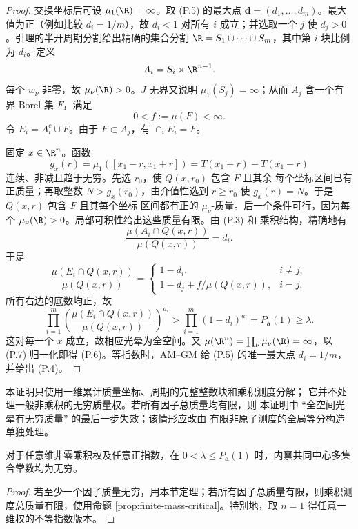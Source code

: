 \begin{proof}
交换坐标后可设 $\mu_1(\R)=\infty$。取 (P.5) 的最大点
$\boldsymbol d=(d_1,\ldots,d_m)$。最大值为正（例如比较
$d_i=1/m$），故 $d_i<1$ 对所有 $i$ 成立；并选取一个 $j$ 使
$d_j>0$。引理的半开周期分割给出精确的集合分割
$\R=S_1\mathbin{\dot\cup}\cdots\mathbin{\dot\cup}S_m$，其中第 $i$ 块比例为
$d_i$。定义
\[
 A_i=S_i\times\R^{n-1}.
\]
每个 $w_\nu$ 非零，故 $\mu_\nu(\R)>0$。$J$ 无界又说明
$\mu_1(S_j)=\infty$；从而 $A_j$ 含一个有界 Borel 集 $F$，满足
\[
 0<f:=\mu(F)<\infty. \tag{P.7}
\]
令 $E_i=A_i^c\cup F$。由于 $F\subset A_j$，有
$\cap_iE_i=F$。

固定 $x\in\R^n$。函数
\[
 g_x(r)=\mu_1([x_1-r,x_1+r])
=T(x_1+r)-T(x_1-r)
\]
连续、非减且趋于无穷。先选 $r_0$，使 $Q(x,r_0)$ 包含 $F$ 且其余
每个坐标区间已有正质量；再取整数 $N>g_x(r_0)$，由介值性选到
$r\ge r_0$ 使 $g_x(r)=N$。于是 $Q(x,r)$ 包含 $F$ 且其每个坐标
区间都有正的 $\mu_\nu$-质量。后一个条件可行，因为每个
$\mu_\nu(\R)>0$。局部可积性给出这些质量有限。由 (P.3) 和
乘积结构，精确地有
\[
 \frac{\mu(A_i\cap Q(x,r))}{\mu(Q(x,r))}=d_i. \tag{P.8}
\]
于是
\[
 \frac{\mu(E_i\cap Q(x,r))}{\mu(Q(x,r))}
 =\begin{cases}
 1-d_i,&i\ne j,\\
 1-d_j+f/\mu(Q(x,r)),&i=j.
 \end{cases}
\]
所有右边的底数均正，故
\[
 \prod_{i=1}^m\left(\frac{\mu(E_i\cap Q(x,r))}{\mu(Q(x,r))}\right)^{a_i}
 >\prod_{i=1}^m(1-d_i)^{a_i}=P_{\boldsymbol a}(1)\ge\lambda. \tag{P.9}
\]
这对每一个 $x$ 成立，故相应光晕为全空间。又
$\mu(\R^n)=\prod_\nu\mu_\nu(\R)=\infty$，以 (P.7) 归一化即得
(P.6)。等指数时，AM--GM 给 (P.5) 的唯一最大点
$d_i=1/m$，并给出 (P.4)。
\end{proof}

\begin{remark}[适用范围]
本证明只使用一维累计质量坐标、周期的完整整数块和乘积测度分解；
它并不处理一般非乘积的无穷质量权。若所有因子总质量均有限，则
本证明中 ``全空间光晕有无穷质量'' 的最后一步失效；该情形应改由
有限非原子测度的全局等分构造单独处理。
\end{remark}


\begin{corollary}[全部乘积权]
对于任意维非零乘积权及任意正指数，在 $0<\lambda\le P_{\boldsymbol a}(1)$ 时，内禀共同中心多集合常数均为无穷。
\end{corollary}
\begin{proof}
若至少一个因子质量无穷，用本节定理；若所有因子总质量有限，则乘积测度总质量有限，使用命题 \ref{prop:finite-mass-critical}。特别地，取 $n=1$ 得任意一维权的不等指数版本。
\end{proof}
